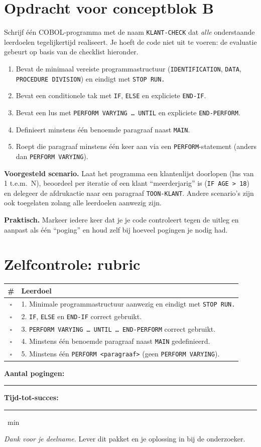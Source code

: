 \documentclass[11pt,a4paper]{article}
\begin{document}
\newpage
\section{Opdracht voor conceptblok B}
\label{sec:opdracht-B}

Schrijf één COBOL-programma met de naam \texttt{KLANT-CHECK} dat \emph{alle} onderstaande leerdoelen tegelijkertijd realiseert. 
Je hoeft de code niet uit te voeren: de evaluatie gebeurt op basis van de checklist hieronder.

\begin{enumerate}
    \item Bevat de minimaal vereiste programmastructuur (\texttt{IDENTIFICATION}, \texttt{DATA}, \texttt{PROCEDURE DIVISION}) en eindigt met \texttt{STOP RUN.}
    \item Bevat een conditionele tak met \texttt{IF}, \texttt{ELSE} en expliciete \texttt{END-IF}.
    \item Bevat een lus met \texttt{PERFORM VARYING \ldots\ UNTIL} en expliciete \texttt{END-PERFORM}.
    \item Definieert minstens één benoemde paragraaf naast \texttt{MAIN}.
    \item Roept die paragraaf minstens één keer aan via een \texttt{PERFORM}-statement (anders dan \texttt{PERFORM VARYING}).
\end{enumerate}

\textbf{Voorgesteld scenario.} Laat het programma een klantenlijst doorlopen (lus van 1 t.e.m.\ N), beoordeel per iteratie of een klant ``meerderjarig'' is (\texttt{IF AGE > 18}) en delegeer de afdrukactie naar een paragraaf \texttt{TOON-KLANT}. Andere scenario's zijn ook toegelaten zolang alle leerdoelen aanwezig zijn.

\textbf{Praktisch.} Markeer iedere keer dat je je code controleert tegen de uitleg en aanpast als één ``poging'' en houd zelf bij hoeveel pogingen je nodig had.

\newpage
\section{Zelfcontrole: rubric}
\label{sec:rubric-B}

\begin{tabularx}{\textwidth}{|c|X|}
\hline
\textbf{\#} & \textbf{Leerdoel} \\
\hline
$\square$ & 1. Minimale programmastructuur aanwezig en eindigt met \texttt{STOP RUN.} \\
\hline
$\square$ & 2. \texttt{IF}, \texttt{ELSE} en \texttt{END-IF} correct gebruikt. \\
\hline
$\square$ & 3. \texttt{PERFORM VARYING \ldots\ UNTIL \ldots\ END-PERFORM} correct gebruikt. \\
\hline
$\square$ & 4. Minstens één benoemde paragraaf naast \texttt{MAIN} gedefinieerd. \\
\hline
$\square$ & 5. Minstens één \texttt{PERFORM <paragraaf>} (geen \texttt{PERFORM VARYING}). \\
\hline
\end{tabularx}

\bigskip
\noindent\textbf{Aantal pogingen:}\ \rule{2cm}{0.4pt} \hfill \textbf{Tijd-tot-succes:}\ \rule{2cm}{0.4pt}~min

\bigskip
\noindent\textit{Dank voor je deelname.} Lever dit pakket en je oplossing in bij de onderzoeker.
\end{document}
